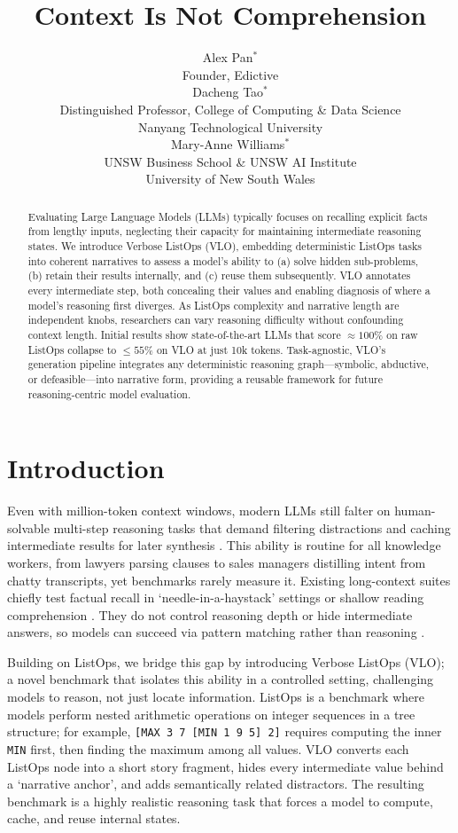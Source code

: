 \documentclass{article}
\title{Context Is Not Comprehension}
\author{
  Alex Pan$^{*}$\\
  Founder, Edictive
  \\[1em]
  Dacheng Tao$^{*}$\\
  Distinguished Professor, College of Computing \& Data Science\\
  Nanyang Technological University
  \\[1em]
  Mary-Anne Williams$^{*}$\\
  UNSW Business School \& UNSW AI Institute\\
  University of New South Wales
}
\date{}  %
\begin{document}
\begingroup
\renewcommand\thefootnote{}
\endgroup
\maketitle
\begin{abstract}
  Evaluating Large Language Models (LLMs) typically focuses on recalling explicit facts from lengthy inputs, neglecting their capacity for maintaining intermediate reasoning states. We introduce Verbose ListOps (VLO), embedding deterministic ListOps tasks into coherent narratives to assess a model's ability to (a) solve hidden sub-problems, (b) retain their results internally, and (c) reuse them subsequently. VLO annotates every intermediate step, both concealing their values and enabling diagnosis of where a model's reasoning first diverges. As ListOps complexity and narrative length are independent knobs, researchers can vary reasoning difficulty without confounding context length. Initial results show state-of-the-art LLMs that score $\approx 100\%$ on raw ListOps collapse to $\leq 55\%$ on VLO at just 10k tokens. Task-agnostic, VLO's generation pipeline integrates any deterministic reasoning graph—symbolic, abductive, or defeasible—into narrative form, providing a reusable framework for future reasoning-centric model evaluation.
\end{abstract}

\section{Introduction}
Even with million-token context windows, modern LLMs still falter on human-solvable multi-step reasoning tasks that demand filtering distractions and caching intermediate results for later synthesis \citep{IllusionOfThinking, shi2023large}. This ability is routine for all knowledge workers, from lawyers parsing clauses to sales managers distilling intent from chatty transcripts, yet benchmarks rarely measure it. Existing long-context suites chiefly test factual recall in `needle-in-a-haystack' settings or shallow reading comprehension \citep{longreason}. They do not control reasoning depth or hide intermediate answers, so models can succeed via pattern matching rather than reasoning \citep{IllusionOfThinking}.

Building on ListOps, we bridge this gap by introducing Verbose ListOps (VLO); a novel benchmark that isolates this ability in a controlled setting, challenging models to reason, not just locate information. ListOps \citep{listops} is a benchmark where models perform nested arithmetic operations on integer sequences in a tree structure; for example, \texttt{[MAX 3 7 [MIN 1 9 5] 2]} requires computing the inner \texttt{MIN} first, then finding the maximum among all values. VLO converts each ListOps node into a short story fragment, hides every intermediate value behind a `narrative anchor', and adds semantically related distractors. The resulting benchmark is a highly realistic reasoning task that forces a model to compute, cache, and reuse internal states.
\end{document}
